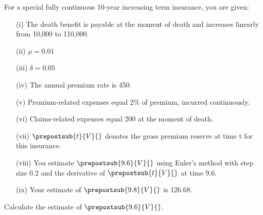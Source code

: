 For a special fully continuous 10-year increasing term insurance, you are given:
\begin{itemize}
\item[(i)] The death benefit is payable at the moment of death and increases linearly from 10,000 to 110,000.
\item[(ii)] $\mu=0.01$
\item[(iii)] $\delta=0.05$
\item[(iv)] The annual premium rate is 450.
\item[(v)] Premium-related expenses equal 2\% of premium, incurred continuously.
\item[(vi)] Claims-related expenses equal 200 at the moment of death.
\item[(vii)] $\prepostsub{t}{V}{}$ denotes the gross premium reserve at time t for this insurance.
\item[(viii)] You estimate $\prepostsub{9.6}{V}{}$ using Euler's method with step size 0.2 and the derivative of $\prepostsub{t}{V}{}$ at time 9.6.
\item[(ix)] Your estimate of $\prepostsub{9.8}{V}{}$ is 126.68.
\end{itemize}
Calculate the estimate of $\prepostsub{9.6}{V}{}$.



